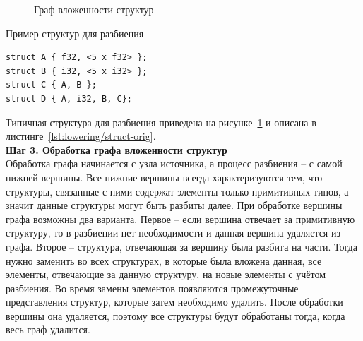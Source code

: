 \begin{figure}[ht]
    \caption{Граф вложенности структур}\label{fig:struct-orig}
\end{figure}

\begin{ListingEnv}[!h]
    \captiondelim{ } 
    \caption{Пример структур для разбиения}\label{lst:lowering/struct-orig}
    \begin{lstlisting}[language={[ISO]C++}]
struct A { f32, <5 x f32> };
struct B { i32, <5 x i32> };
struct C { A, B };
struct D { A, i32, B, C};
    \end{lstlisting}
\end{ListingEnv}

Типичная структура для разбиения приведена на рисунке~\cref{fig:struct-orig} и описана в листинге~\cref{lst:lowering/struct-orig}.\\

\textbf{Шаг 3. Обработка графа вложенности структур}\\

Обработка графа начинается с узла источника, а процесс разбиения -- с самой нижней вершины. Все нижние вершины всегда характеризуются тем, что структуры, связанные с ними содержат элементы только примитивных типов, а значит данные структуры могут быть разбиты далее. При обработке вершины графа возможны два варианта.
Первое -- если вершина отвечает за примитивную структуру, то в разбиении нет необходимости и данная вершина удаляется из графа.
Второе -- структура, отвечающая за вершину была разбита на части. Тогда нужно заменить во всех структурах, в которые была вложена данная, все элементы, отвечающие за данную структуру, на новые элементы с учётом разбиения.
Во время замены элементов появляются промежуточные представления структур, которые затем необходимо удалить.
После обработки вершины она удаляется, поэтому все структуры будут обработаны тогда, когда весь граф удалится.

